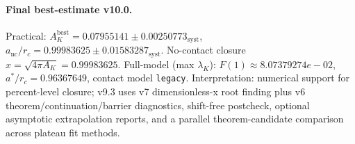 \paragraph{Final best-estimate v10.0.}
Practical: $A_K^{\mathrm{best}} = 0.07955141 \pm 0.00250773_{\mathrm{syst}}$, $a_{\mathrm{nc}}/r_c = 0.99983625 \pm 0.01583287_{\mathrm{syst}}$.
No-contact closure $x = \sqrt{4\pi A_K} = 0.99983625$.
Full-model (max $\lambda_K$): $F(1) \approx 8.07379274e-02$, $a^*/r_c = 0.96367649$, contact model \texttt{legacy}.
Interpretation: numerical support for percent-level closure; v9.3 uses v7 dimensionless-x root finding plus v6 theorem/continuation/barrier diagnostics, shift-free postcheck, optional asymptotic extrapolation reports, and a parallel theorem-candidate comparison across plateau fit methods.
